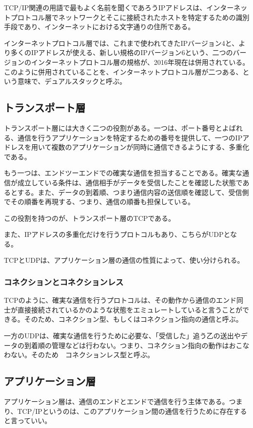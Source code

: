 TCP/IP関連の用語で最もよく名前を聞くであろうIPアドレスは、インターネットプロトコル層でネットワークとそこに接続されたホストを特定するための識別手段であり、インターネットにおける文字通りの住所である。

インターネットプロトコル層では、これまで使われてきたIPバージョン4と、より多くのIPアドレスが使える、新しい規格のIPバージョン6という、二つのバージョンのインターネットプロトコル層の規格が、2016年現在は併用されている。このように併用されていることを、インターネットプロトコル層が二つある、という意味で、デュアルスタックと呼ぶ。

\subsection{トランスポート層}
トランスポート層には大きく二つの役割がある。一つは、ポート番号とよばれる、通信を行うアプリケーションを特定するための番号を提供して、一つのIPアドレスを用いて複数のアプリケーションが同時に通信できるようにする、多重化である。

もう一つは、エンドツーエンドでの確実な通信を担当することである。確実な通信が成立している条件は、通信相手がデータを受信したことを確認した状態であるとする。また、データの到着順、つまり通信内容の送信順を確認して、受信側でその順番を再現する、つまり、通信の順番も担保している。

この役割を持つのが、トランスポート層のTCPである。


また、IPアドレスの多重化だけを行うプロトコルもあり、こちらがUDPとなる。

TCPとUDPは、アプリケーション層の通信の性質によって、使い分けられる。


\subsubsection{コネクションとコネクションレス}
TCPのように、確実な通信を行うプロトコルは、その動作から通信のエンド同士が直接接続されているかのような状態をエミュレートしていると言うことができる。そのため、コネクション型、もしくはコネクション指向の通信と呼ぶ。

一方のUDPは、確実な通信を行うために必要な、「受信した」追う乙の送出やデータの到着順の管理などは行わない。つまり、コネクション指向の動作はおこなわない。そのため　コネクションレス型と呼ぶ。


\subsection{アプリケーション層}
アプリケーション層は、通信のエンドとエンドで通信を行う主体である。つまり、TCP/IPというのは、このアプリケーション間の通信を行うために存在すると言っていい。

